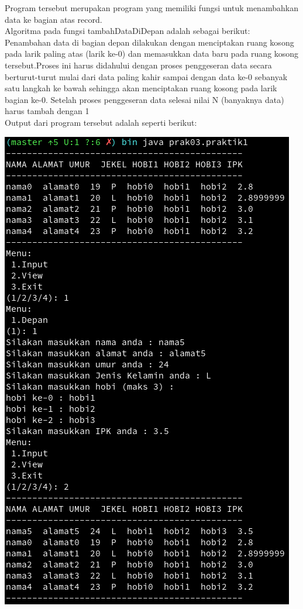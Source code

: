 \documentclass[a4paper,12pt]{article}
\begin{document}
Program tersebut merupakan program yang memiliki fungsi untuk menambahkan data ke bagian atas record.\\
Algoritma pada fungsi tambahDataDiDepan adalah sebagai berikut:\\
Penambahan data di bagian depan dilakukan dengan menciptakan ruang kosong pada  larik  paling  atas  (larik  ke-0)  dan
memasukkan  data  baru  pada  ruang  kosong tersebut.Proses  ini  harus  didahului  dengan  proses  penggeseran  data
secara  berturut-turut mulai dari data paling kahir sampai dengan data ke-0 sebanyak satu langkah ke bawah sehingga
akan menciptakan ruang kosong pada larik bagian ke-0. Setelah proses penggeseran data selesai nilai N (banyaknya data)
harus tambah dengan 1\\
Output dari program tersebut adalah seperti berikut:
\begin{center}
    \includegraphics[scale=.7]{prak1.png} 
\end{center}
\end{document}
